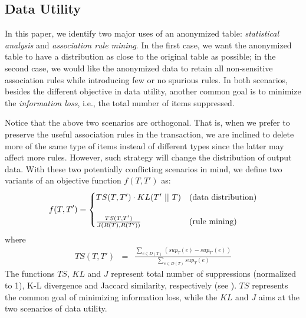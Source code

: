 \subsection{Data Utility}
\label{sec:du}
In this paper, we identify two major uses of an anonymized table:
{\em statistical analysis} and {\em association rule mining}.
In the first case, we want the anonymized table to have a distribution
as close to the original table as possible;
in the second case,
we would like the anonymized data to
retain all non-sensitive association rules while introducing few
or no spurious rules.
In both scenarios, besides the different objective in data utility,
another common goal is to minimize the {\em information loss}, i.e.,
the total number of items suppressed. 
 
Notice that the above two scenarios are orthogonal. That is, 
when we prefer to preserve the useful association rules in the transaction,
we are inclined to delete more of the same type of items instead of 
different types since the latter may affect more rules. 
However, such strategy will
change the distribution of output data. 
With these two potentially conflicting scenarios in mind, 
we define two variants of an objective function $f(T, T')$ as:
\begin{equation}
f(T, T') =
\begin{cases}
TS(T, T')\cdot KL(T'~||~T) & \rm{(data~ distribution)} \\
& \\
\frac{TS(T, T')}{J(R(T), R(T'))} & \rm{(rule~ mining)}
\end{cases}
\end{equation}
where
\begin{eqnarray}
TS(T,T') &=& \frac{\sum_{e\in D(T)}(sup_T(e) - sup_{T'}(e))}{\sum_{e\in D(T)}sup_{T}(e)} %
\end{eqnarray}
The functions $TS$, $KL$ and $J$ represent
total number of suppressions (normalized to 1),
K-L divergence\cite{kl-divergence} and
Jaccard similarity\cite{jaccard-sim}, respectively 
(see ). $TS$ represents the common goal of
minimizing information loss, while the $KL$ and $J$ aims at the 
two scenarios of data utility.

